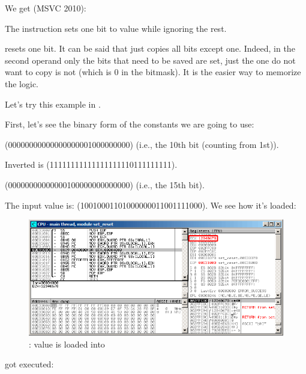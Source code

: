 

We get (MSVC 2010):




The \OR instruction sets one bit to value while ignoring the rest.


\AND resets one bit. It can be said that \AND just copies all bits except one.
Indeed, in the second \AND operand only the bits that need to be saved are set,
just the one do not want to copy is not (which is 0 in the bitmask).
It is the easier way to memorize the logic.

\clearpage
\myparagraphold{\olly}

Let's try this example in \olly.

First, let's see the binary form of the constants we are going to use:

 (0000000000000000000{\color{red}1}000000000) (i.e., the 10th bit (counting from 1st)).

Inverted  is  (1111111111111111111{\color{red}0}111111111).

 (00000000000000{\color{red}1}00000000000000) (i.e., the 15th bit).

The input value is:  (10010001101000000011001111000).
We see how it's loaded:

\begin{figure}[H]
\centering
\includegraphics[scale=\FigScale]{patterns/14_bitfields/2_set_reset/olly1.png}
\caption{\olly: value is loaded into \ECX}
\label{fig:set_reset_olly1}
\end{figure}

\clearpage
\OR got executed:

